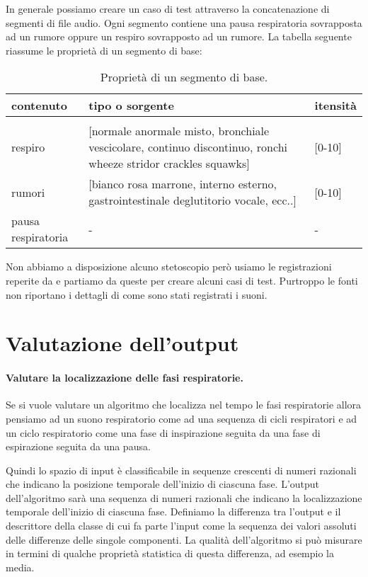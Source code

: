 In generale possiamo creare un caso di test attraverso la concatenazione di segmenti di file audio. Ogni segmento contiene una pausa respiratoria sovrapposta ad un rumore oppure un respiro sovrapposto ad un rumore. La tabella seguente riassume le propriet\`a di un segmento di base:
\begin{center}
  \begin{table}[!h]
    \centering
    \begin{tabular}{p{} | p{} l}
      \hline
	  contenuto
	& 
	  tipo o sorgente
	& 
	  itensit\`a
      \\\hline\\
	  respiro
	& 
	  [normale anormale misto, bronchiale vescicolare, continuo discontinuo, ronchi wheeze stridor crackles squawks]
	& 
	  [0-10]
      \\
	  rumori
	& 
	  [bianco rosa marrone, interno esterno, gastrointestinale deglutitorio vocale, ecc..]
	& 
	  [0-10]
      \\
	  pausa respiratoria
	& 
	  -
	& 
	  -
      \\\hline
    \end{tabular}
    \caption{Propriet\`a di un segmento di base.}
    \label{segmentodibase}
  \end{table}
\end{center}


Non abbiamo a disposizione alcuno stetoscopio per\`o usiamo le registrazioni reperite da \cite{SoundRepositories} e partiamo da queste per creare alcuni casi di test.
Purtroppo le fonti non riportano i dettagli di come sono stati registrati i suoni. 


\section{Valutazione dell'output}
\label{valutareOutput}
\paragraph{Valutare la localizzazione delle fasi respiratorie.}
Se si vuole valutare un algoritmo che localizza nel tempo le fasi respiratorie allora pensiamo ad un suono respiratorio come ad una sequenza di cicli respiratori e ad  un ciclo respiratorio come una fase di inspirazione seguita da una fase di espirazione seguita da una pausa. 

Quindi lo spazio di input \`e classificabile in sequenze crescenti di numeri razionali che indicano la posizione temporale dell'inizio di ciascuna fase. L'output dell'algoritmo sar\`a una sequenza di numeri razionali che indicano la localizzazione temporale dell'inizio di ciascuna fase. 
Definiamo la differenza tra l'output e il descrittore della classe di cui fa parte l'input come la sequenza dei valori assoluti delle differenze delle singole componenti. 
La qualit\`a dell'algoritmo si pu\`o misurare in termini di qualche propriet\`a statistica di questa differenza, ad esempio la media.


